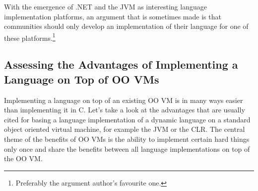 \documentclass{llncs}
\begin{document}
With the emergence of .NET and the JVM as interesting language
implementation platforms, an argument that is sometimes made is that
communities should only develop an implementation of their language for
one of these platforms.\footnote{Preferably the argument author's favourite
one.}

\subsection{Assessing the Advantages of Implementing a Language on Top of OO
VMs}

Implementing a language on top of an existing OO VM is in many ways easier than
implementing it in C. Let's take a look at the advantages that are usually
cited for basing a
language implementation of a dynamic language on a standard object oriented
virtual machine, for example the JVM or the CLR. The central theme of the
benefits  of OO VMs is the ability to implement certain hard things only once
and share the benefits between all language implementations on top of the OO VM.
\end{document}
